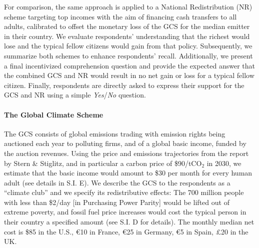 For comparison, %
the same approach is applied to a National Redistribution (NR) scheme targeting top incomes %
with the aim of financing cash transfers to all adults, %
calibrated to offset the monetary loss of the GCS for the median emitter in their country. We evaluate respondents' understanding that the richest would lose and the typical fellow citizens would gain from that policy. %
Subsequently, we summarize both schemes to enhance respondents' recall. Additionally, we present a final incentivized comprehension question and provide the expected answer that the combined GCS and NR would result in no net gain or loss for a typical fellow citizen. Finally, respondents are directly asked to express their support for the GCS and NR using a simple \textit{Yes}/\textit{No} question.

\begin{tcolorbox}\label{box:GCS}
  \paragraph{The Global Climate Scheme} The GCS consists of global emissions trading with emission rights being auctioned each year to polluting firms, and of a global basic income, funded by the auction revenues. Using the price and emissions trajectories from the report by Stern \& Stiglitz,\cite{stern_report_2017} and in particular a carbon price of \$90/tCO$_\text{2}$ in 2030, we estimate that the basic income would amount to \$30 per month for every human adult %
  (see details in S.I. E). %
  We describe the GCS to the respondents as a ``climate club'' and we specify its redistributive effects: The 700 million people with less than \$2/day [in Purchasing Power Parity] would be lifted out of extreme poverty, and fossil fuel price increases would cost the typical person in their country a specified amount (see S.I. D %
  for details). 
  The monthly median net cost is \$85 in the U.S., \euro{}10 in France, \euro{}25 in Germany, \euro{}5 in Spain, £20 in the UK.
\end{tcolorbox}


